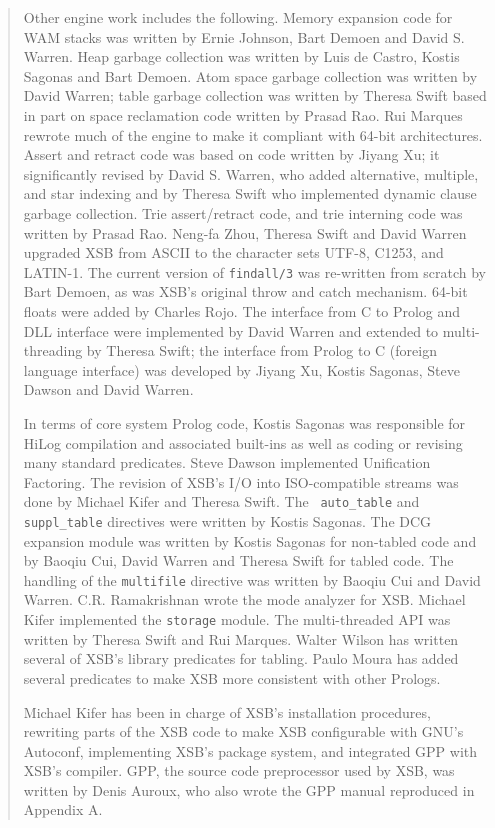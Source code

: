 \begin{quote}
Other engine work includes the following.  Memory expansion code for
WAM stacks was written by Ernie Johnson, Bart Demoen and David
S. Warren.  Heap garbage collection was written by Luis de Castro,
Kostis Sagonas and Bart Demoen.  Atom space garbage collection was
written by David Warren; table garbage collection was written by
Theresa Swift based in part on space reclamation code written by
Prasad Rao.  Rui Marques rewrote much of the engine to make it
compliant with 64-bit architectures.  Assert and retract code was
based on code written by Jiyang Xu; it significantly revised by David
S. Warren, who added alternative, multiple, and star indexing and by
Theresa Swift who implemented dynamic clause garbage collection. Trie
assert/retract code, and trie interning code was written by Prasad
Rao.  Neng-fa Zhou, Theresa Swift and David Warren upgraded XSB from
ASCII to the character sets UTF-8, C1253, and LATIN-1.  The current
version of {\tt findall/3} was re-written from scratch by Bart Demoen,
as was XSB's original throw and catch mechanism.  64-bit floats were
added by Charles Rojo.  The interface from C to Prolog and DLL
interface were implemented by David Warren and extended to
multi-threading by Theresa Swift; the interface from Prolog to C
(foreign language interface) was developed by Jiyang Xu, Kostis
Sagonas, Steve Dawson and David Warren.

In terms of core system Prolog code, Kostis Sagonas was responsible
for HiLog compilation and associated built-ins as well as coding or
revising many standard predicates.  Steve Dawson implemented
Unification Factoring.  The revision of XSB's I/O into ISO-compatible
streams was done by Michael Kifer and Theresa Swift.  The {\tt
  auto\_table} and {\tt suppl\_table} directives were written by
Kostis Sagonas.  The DCG expansion module was written by Kostis
Sagonas for non-tabled code and by Baoqiu Cui, David Warren and
Theresa Swift for tabled code.  The handling of the {\tt multifile}
directive was written by Baoqiu Cui and David
Warren. C.R. Ramakrishnan wrote the mode analyzer for XSB.  Michael
Kifer implemented the {\tt storage} module.  The multi-threaded API
was written by Theresa Swift and Rui Marques.  Walter Wilson has
written several of XSB's library predicates for tabling.  Paulo Moura
has added several predicates to make XSB more consistent with other
Prologs.  

Michael Kifer has been in charge of XSB's installation procedures,
rewriting parts of the XSB code to make XSB configurable with GNU's
Autoconf, implementing XSB's package system, and integrated GPP with
XSB's compiler.  GPP, the source code preprocessor used by XSB, was
written by Denis Auroux, who also wrote the GPP manual reproduced in
Appendix A.


\end{quote}

